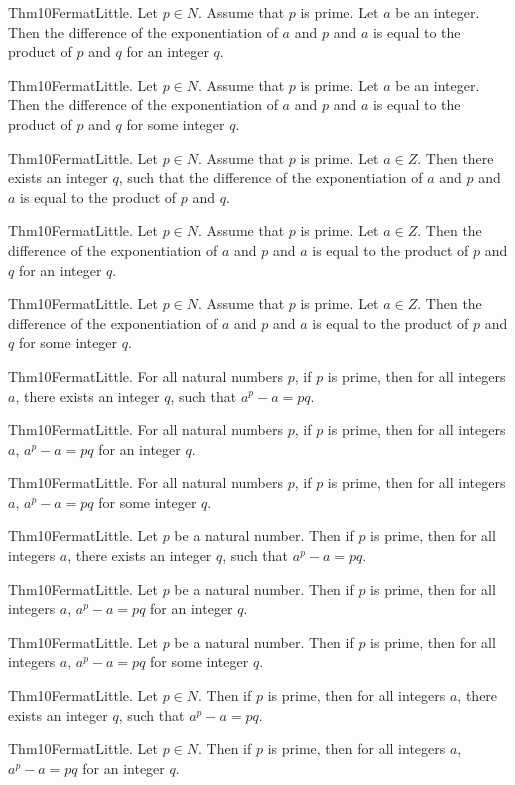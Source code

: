\documentclass{article}
\begin{document}
Thm10FermatLittle. Let $p \in N$. Assume that $p$ is prime. Let $a$ be an integer. Then the difference of the exponentiation of $a$ and $p$ and $a$ is equal to the product of $p$ and $q$ for an integer $q$.

Thm10FermatLittle. Let $p \in N$. Assume that $p$ is prime. Let $a$ be an integer. Then the difference of the exponentiation of $a$ and $p$ and $a$ is equal to the product of $p$ and $q$ for some integer $q$.

Thm10FermatLittle. Let $p \in N$. Assume that $p$ is prime. Let $a \in Z$. Then there exists an integer $q$, such that the difference of the exponentiation of $a$ and $p$ and $a$ is equal to the product of $p$ and $q$.

Thm10FermatLittle. Let $p \in N$. Assume that $p$ is prime. Let $a \in Z$. Then the difference of the exponentiation of $a$ and $p$ and $a$ is equal to the product of $p$ and $q$ for an integer $q$.

Thm10FermatLittle. Let $p \in N$. Assume that $p$ is prime. Let $a \in Z$. Then the difference of the exponentiation of $a$ and $p$ and $a$ is equal to the product of $p$ and $q$ for some integer $q$.

Thm10FermatLittle. For all natural numbers $p$, if $p$ is prime, then for all integers $a$, there exists an integer $q$, such that $a ^ {p}- a = p q$.

Thm10FermatLittle. For all natural numbers $p$, if $p$ is prime, then for all integers $a$, $a ^ {p}- a = p q$ for an integer $q$.

Thm10FermatLittle. For all natural numbers $p$, if $p$ is prime, then for all integers $a$, $a ^ {p}- a = p q$ for some integer $q$.

Thm10FermatLittle. Let $p$ be a natural number. Then if $p$ is prime, then for all integers $a$, there exists an integer $q$, such that $a ^ {p}- a = p q$.

Thm10FermatLittle. Let $p$ be a natural number. Then if $p$ is prime, then for all integers $a$, $a ^ {p}- a = p q$ for an integer $q$.

Thm10FermatLittle. Let $p$ be a natural number. Then if $p$ is prime, then for all integers $a$, $a ^ {p}- a = p q$ for some integer $q$.

Thm10FermatLittle. Let $p \in N$. Then if $p$ is prime, then for all integers $a$, there exists an integer $q$, such that $a ^ {p}- a = p q$.

Thm10FermatLittle. Let $p \in N$. Then if $p$ is prime, then for all integers $a$, $a ^ {p}- a = p q$ for an integer $q$.
\end{document}
